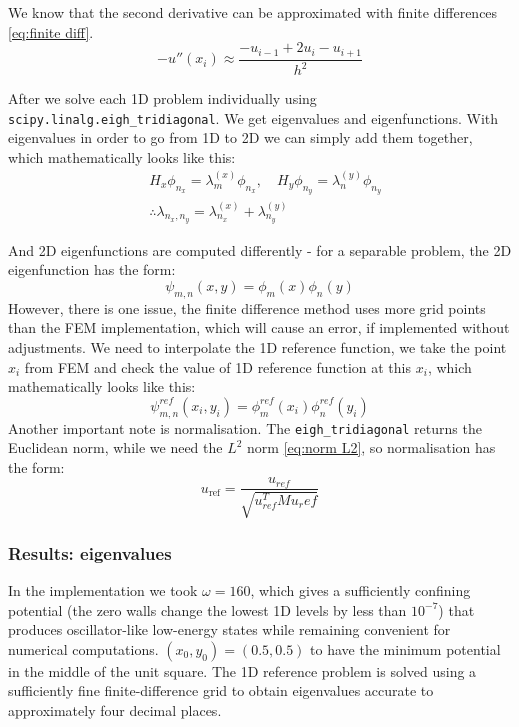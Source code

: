 \documentclass[conference]{IEEEtran}
\begin{document}
We know that the second derivative can be approximated with finite differences \ref{eq:finite diff}.
\begin{equation}
    -u''(x_i) \approx \frac{-u_{i-1} + 2u_i - u_{i+1}}{h^2}
    \label{eq:finite diff}
\end{equation}

After we solve each 1D problem individually using \texttt{scipy.linalg.eigh\_tridiagonal}. We get eigenvalues and eigenfunctions. With eigenvalues in order to go from 1D to 2D we can simply add them together, which mathematically looks like this:
\begin{equation}
\begin{aligned}
    &H_x\phi_{n_x} = \lambda_m^{(x)}\phi_{n_x}, \quad H_y\phi_{n_y} = \lambda_n^{(y)}\phi_{n_y} \\
    &\therefore \lambda_{n_x,n_y} = \lambda_{n_x}^{(x)} + \lambda_{n_y}^{(y)}
\end{aligned}
\end{equation}

And 2D eigenfunctions are computed differently - for a separable problem, the 2D eigenfunction has the form:
\begin{equation}
    \psi_{m,n}(x, y) = \phi_m(x)\phi_n(y)
\end{equation}
However, there is one issue, the finite difference method uses more grid points than the FEM implementation, which will cause an error, if implemented without adjustments. We need to interpolate the 1D reference function, we take the point $x_i$ from FEM and check the value of 1D reference function at this $x_i$, which mathematically looks like this:
\begin{equation}
    \psi_{m, n}^{ref}(x_i, y_i) = \phi_m^{ref}(x_i)\phi_n^{ref}(y_i)
\end{equation}
Another important note is normalisation. The \texttt{eigh\_tridiagonal} returns the Euclidean norm, while we need the $L^2$ norm \ref{eq:norm L2}, so normalisation has the form:
\begin{equation}
    u_{\mathrm{ref}} = \frac{u_{ref}}{\sqrt{u_{ref}^TMu_ref}}
\end{equation}

\subsubsection{Results: eigenvalues}
In the implementation we took $\omega = 160$, which gives a sufficiently confining potential (the zero walls change the lowest 1D levels by less than $10^{-7}$) that produces oscillator-like low-energy states while remaining convenient for numerical computations. $(x_0, y_0) = (0.5, 0.5)$ to have the minimum potential in the middle of the unit square. The 1D reference problem is solved using a sufficiently fine finite-difference grid to obtain eigenvalues accurate to approximately four decimal places.
\end{document}
